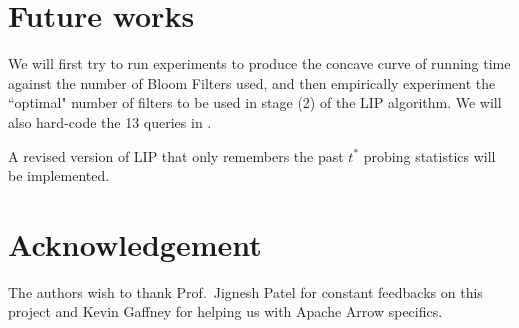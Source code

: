 \documentclass[10pt]{article}
\begin{document}

\section{Future works}

We will first try to run experiments to produce the concave curve of running time against the number of Bloom Filters used, and then empirically experiment the ``optimal" number of filters to be used in stage (2) of the LIP algorithm. We will also hard-code the 13 queries in \cite{o2009star}.

A revised version of LIP that only remembers the past $t^*$ probing statistics will be implemented.



\section*{Acknowledgement}
The authors wish to thank Prof.\ Jignesh Patel for constant feedbacks on this project and Kevin Gaffney for helping us with Apache Arrow specifics.


{}

\end{document}
